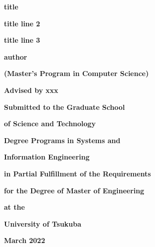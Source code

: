 
\centerline{
    \fontsize{20pt}{25pt}\selectfont
    \textbf{title}
}
\vspace{3mm}
\centerline{
    \fontsize{20pt}{25pt}\selectfont
    \textbf{title line 2}
}
\vspace{4mm}
\centerline{
    \fontsize{20pt}{25pt}\selectfont
    \textbf{title line 3}
} 
\vspace{20mm}

\centerline{
    \fontsize{20pt}{0}\selectfont
	\textbf{author}
} 
\vspace{10mm}

\centerline{
    \fontsize{18pt}{0}\selectfont
	\textbf{(Master's Program in Computer Science)}
} 
\vspace{20mm}
\centerline{
    \fontsize{20pt}{0}\selectfont
	\textbf{Advised by xxx}
} 
\vspace{20mm}
\centerline{
    \fontsize{16pt}{10pt}\selectfont
	\textbf{Submitted to the Graduate School}
} 
\vspace{4mm}
\centerline{
    \fontsize{16pt}{10pt}\selectfont
	\textbf{of Science and Technology}
} 
\vspace{3mm}
\centerline{
    \fontsize{16pt}{10pt}\selectfont
	\textbf{Degree Programs in Systems and}
} 
\vspace{3mm}
\centerline{
    \fontsize{16pt}{10pt}\selectfont
	\textbf{Information Engineering}
} 
\vspace{3mm}
\centerline{
    \fontsize{16pt}{10pt}\selectfont
	\textbf{in Partial Fulfillment of the Requirements }
} 
\vspace{3mm}
\centerline{
    \fontsize{16pt}{10pt}\selectfont
	\textbf{for the Degree of Master of Engineering}
} 
\vspace{3mm}
\centerline{
    \fontsize{16pt}{10pt}\selectfont
	\textbf{at the}
} 
\vspace{3mm}
\centerline{
    \fontsize{16pt}{10pt}\selectfont
	\textbf{University of Tsukuba}
} 
\vspace{20mm}
\centerline{
    \fontsize{20pt}{0}\selectfont
	\textbf{March 2022}
} 
\thispagestyle{empty}  